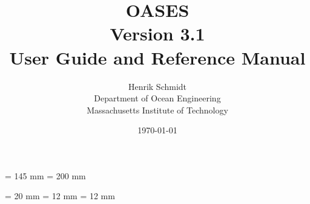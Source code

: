 \pagestyle{headings}

\textwidth  = 145 mm
\textheight = 200 mm

\topmargin      = 20 mm
\oddsidemargin  = 12 mm
\evensidemargin = 12 mm

\setlength{\parskip}{0.3cm}


\newcommand{\mitspecial}[3]{
 \centerline{\psfig{figure=#2,height=#1cm}}
}

\newcommand{\figmit}[4]{
   \begin{figure}
      \centerline{\psfig{figure=#1,height=#2cm}}
      \caption{#3} \label{#4}
   \end{figure}
}

\newcommand{\figmittwo}[6]{
    \begin{figure}
       \vbox{\centerline{\psfig{figure=#1,height=#2cm}}}
       \vbox{\centerline{\psfig{figure=#3,height=#4cm}}}
       \caption{#5} \label{#6}
    \end{figure}          }

\newcommand{\figmithtwo}[6]{
    \begin{figure}
   \centerline{\hbox{
       \psfig{figure=#1,height=#2cm}
       \psfig{figure=#3,height=#4cm}
              }     }
       \caption{#5} \label{#6}
    \end{figure}          }



\title{{\bf OASES} \\ Version 3.1 \\  User Guide and Reference Manual}

\author{Henrik Schmidt \\Department of Ocean Engineering 
\\ Massachusetts Institute of Technology}
\date{\today}


\maketitle

\newpage

\tableofcontents


\newpage

\newpage

\newpage

\newpage

\newpage

\newpage

\newpage

\newpage

\newpage

\newpage

\newpage

\newpage

\newpage

\newpage

\newpage

\newpage

\newpage

\newpage






